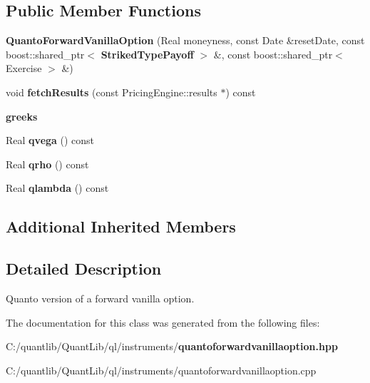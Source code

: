 \subsection*{Public Member Functions}
\begin{DoxyCompactItemize}
\item 
{\bfseries Quanto\+Forward\+Vanilla\+Option} (Real moneyness, const Date \&reset\+Date, const boost\+::shared\+\_\+ptr$<$ {\bf Striked\+Type\+Payoff} $>$ \&, const boost\+::shared\+\_\+ptr$<$ Exercise $>$ \&)\label{class_quant_lib_1_1_quanto_forward_vanilla_option_a74cfbfbb1a9034f6a0e832358aec525f}

\item 
void {\bfseries fetch\+Results} (const Pricing\+Engine\+::results $\ast$) const \label{class_quant_lib_1_1_quanto_forward_vanilla_option_aba14a9e66dd417ca8e110b032834f35f}

\end{DoxyCompactItemize}
\begin{Indent}{\bf greeks}\par
\begin{DoxyCompactItemize}
\item 
Real {\bfseries qvega} () const \label{class_quant_lib_1_1_quanto_forward_vanilla_option_a79202cd724d8da48aeb8ff8013e6e7fe}

\item 
Real {\bfseries qrho} () const \label{class_quant_lib_1_1_quanto_forward_vanilla_option_ad1d30a108d3c8f43935ad5714f69a2cb}

\item 
Real {\bfseries qlambda} () const \label{class_quant_lib_1_1_quanto_forward_vanilla_option_ab0db6717c03d4d7b7295bb5189d92d46}

\end{DoxyCompactItemize}
\end{Indent}
\subsection*{Additional Inherited Members}


\subsection{Detailed Description}
Quanto version of a forward vanilla option. 



The documentation for this class was generated from the following files\+:\begin{DoxyCompactItemize}
\item 
C\+:/quantlib/\+Quant\+Lib/ql/instruments/{\bf quantoforwardvanillaoption.\+hpp}\item 
C\+:/quantlib/\+Quant\+Lib/ql/instruments/quantoforwardvanillaoption.\+cpp\end{DoxyCompactItemize}
